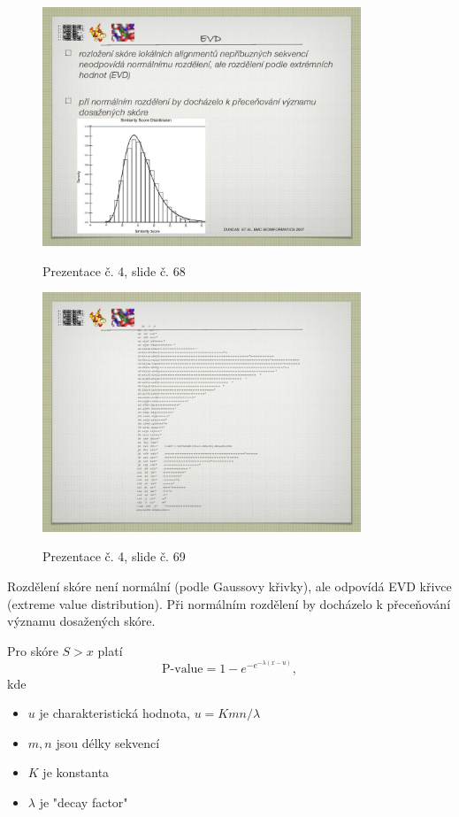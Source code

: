 \documentclass[DIV=8]{scrreprt}
\begin{document}
\begin{description}
\begin{figure}
    \caption{Prezentace č. 4, slide č. 68}
    \includegraphics[width=0.85\textwidth]{slides-4/slide-68.jpg}
    \centering
    \label{slides-4-slide-68}
\end{figure}
\begin{figure}
    \caption{Prezentace č. 4, slide č. 69}
    \includegraphics[width=0.85\textwidth]{slides-4/slide-69.jpg}
    \centering
    \label{slides-4-slide-69}
\end{figure}

Rozdělení skóre není normální (podle Gaussovy křivky), ale odpovídá EVD křivce (extreme value distribution). Při normálním rozdělení by docházelo k přeceňování významu dosažených skóre.

Pro skóre \(S > x\) platí
\[\text{P-value} = 1 - e^{-e^{-\lambda (x - u)}},\]
kde
\begin{itemize}[nosep]
    \item \(u\) je charakteristická hodnota, \(u = Kmn / \lambda\)
    \item \(m, n\) jsou délky sekvencí
    \item \(K\) je konstanta
    \item \(\lambda\) je "decay factor"
\end{itemize}



\end{description}
\end{document}
